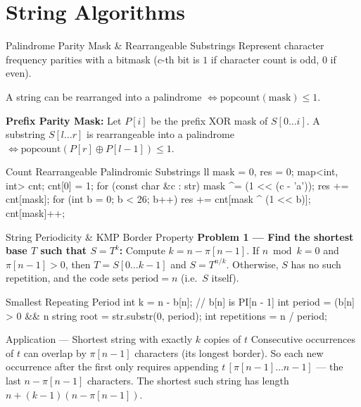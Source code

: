 \documentclass[10pt]{article}
\newcommand{\complexity}[1]{%
  \tcbox[on line,
    colback=tagbg,
    colframe=tagbg,
    boxrule=0pt,
    arc=2pt,
    boxsep=0pt,
    left=3.5pt, right=3.5pt, top=1.5pt, bottom=1.5pt
  ]{\color{tagtext}\scriptsize\bfseries\ensuremath{#1}}%
}
\begin{document}
\newpage
\section{String Algorithms}

\begin{conceptbox}{Palindrome Parity Mask \& Rearrangeable Substrings}
    Represent character frequency parities with a bitmask ($c$-th bit is $1$ if character count is odd, $0$ if even).
    \begin{resultbox}
        A string can be rearranged into a palindrome $\iff \text{popcount}(\text{mask}) \le 1$.
    \end{resultbox}
    \textbf{Prefix Parity Mask:} Let $P[i]$ be the prefix XOR mask of $S[0 \dots i]$. A substring $S[l \dots r]$ is rearrangeable into a palindrome $\iff \text{popcount}(P[r] \oplus P[l - 1]) \le 1$.
\end{conceptbox}

\begin{vscode}{Count Rearrangeable Palindromic Substrings \complexity{O(|\Sigma| \cdot N \log N)}}
ll mask = 0, res = 0;
map<int, int> cnt;
cnt[0] = 1;
for (const char &c : str) 
{
    mask ^= (1 << (c - 'a'));
    res += cnt[mask];
    for (int b = 0; b < 26; b++)
        res += cnt[mask ^ (1 << b)];
    cnt[mask]++;
}
\end{vscode}

\begin{conceptbox}{String Periodicity \& KMP Border Property}
    \textbf{Problem 1 --- Find the shortest base $T$ such that $S = T^k$:} Compute $k = n - \pi[n - 1]$. If $n \bmod k = 0$ and $\pi[n - 1] > 0$, then $T = S[0 \dots k - 1]$ and $S = T^{n / k}$. Otherwise, $S$ has no such repetition, and the code sets $\text{period} = n$ (i.e.\ $S$ itself).
\end{conceptbox}

\begin{vscode}{Smallest Repeating Period \complexity{O(N)}}
int k = n - b[n]; // b[n] is PI[n - 1]
int period = (b[n] > 0 && n %
string root = str.substr(0, period);
int repetitions = n / period;
\end{vscode}

\begin{conceptbox}{Application --- Shortest string with exactly $k$ copies of $t$}
    Consecutive occurrences of $t$ can overlap by $\pi[n - 1]$ characters (its longest border). So each new occurrence after the first only requires appending $t\,[\pi[n-1] \dots n-1]$ --- the last $n - \pi[n-1]$ characters. The shortest such string has length $n + (k - 1)(n - \pi[n-1])$.
\end{conceptbox}
\end{document}
